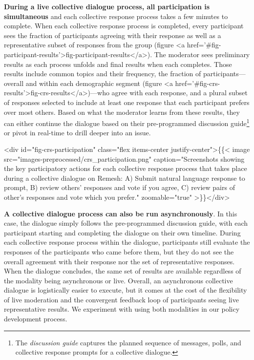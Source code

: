 \documentclass{article}
\begin{document}
\textbf{During a live collective dialogue process, all participation is simultaneous} and each collective response process takes a few minutes to complete. When each collective response process is completed, every participant sees the fraction of participants agreeing with their response as well as a representative subset of responses from the group (figure <a href='#fig-participant-results'>fig-participant-results</a>). The moderator sees preliminary results as each process unfolds and final results when each completes. Those results include common topics and their frequency, the fraction of participants---overall and within each demographic segment (figure <a href='#fig-crs-results'>fig-crs-results</a>)---who agree with each response, and a plural subset of responses selected to include at least one response that each participant prefers over most others. Based on what the moderator learns from these results, they can either continue the dialogue based on their pre-programmed discussion guide\footnote{The \emph{discussion guide} captures the planned sequence of messages, polls, and collective response prompts for a collective dialogue.} or pivot in real-time to drill deeper into an issue.

<div id="fig-crs-participation" class="flex items-center justify-center">\{\{< image src="images-preprocessed/crs_participation.png" caption="Screenshots showing the key participatory actions for each collective response process that takes place during a collective dialogue on Remesh: A) Submit natural language response to prompt, B) review others' responses and vote if you agree, C) review pairs of other's responses and vote which you prefer." zoomable="true" >\}\}</div>



\textbf{A collective dialogue process can also be run asynchronously}. In this case, the dialogue simply follows the pre-programmed discussion guide, with each participant starting and completing the dialogue on their own timeline. During each collective response process within the dialogue, participants still evaluate the responses of the participants who came before them, but they do not see the overall agreement with their response nor the set of representative responses. When the dialogue concludes, the same set of results are available regardless of the modality being asynchronous or live. Overall, an asynchronous collective dialogue is logistically easier to execute, but it comes at the cost of the flexibility of live moderation and the convergent feedback loop of participants seeing live representative results. We experiment with using both modalities in our policy development process. 
\end{document}
